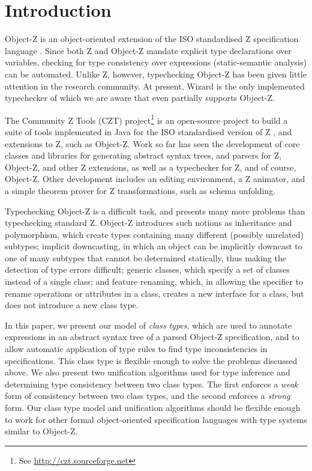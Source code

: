 \section{Introduction}

Object-Z \cite{smith00} is an object-oriented extension of the ISO
standardised Z specification language \cite{isoz}. Since both Z
and Object-Z mandate explicit type declarations over variables,
checking for type consistency over expressions (static-semantic
analysis) can be automated. Unlike Z, however, typechecking Object-Z
has been given little attention in the research community.  At
present, Wizard \cite{johnston96} is the only implemented typechecker
of which we are aware that even partially supports Object-Z.

The Community Z Tools (CZT) project\footnote{See
\url{http://czt.sourceforge.net}} is an open-source project to build a
suite of tools implemented in Java for the ISO standardised version of
Z \cite{isoz}, and extensions to Z, such as Object-Z. Work so far has
seen the development of core classes and libraries for generating
abstract syntax trees, and parsers for Z, Object-Z, and other Z
extensions, as well as a typechecker for Z, and of course,
Object-Z. Other development includes an editing environment, a Z
animator, and a simple theorem prover for  Z transformations, such as
schema unfolding.

Typechecking Object-Z is a difficult task, and presents many more
problems than typechecking standard Z. Object-Z introduces such
notions as inheritance and polymorphism, which create types containing
many different (possibly unrelated) subtypes; implicit downcasting, in
which an object can be implicitly downcast to one of many subtypes
that cannot be determined statically, thus making the detection of
type errors difficult; generic classes, which specify a set of classes
instead of a single class; and feature renaming, which, in allowing
the specifier to rename operations or attributes in a class, creates a
new interface for a class, but does not introduce a new class type.

In this paper, we present our model of {\em class types}, which are
used to annotate expressions in an abstract syntax tree of a parsed
Object-Z specification, and to allow automatic application of type
rules to find type inconsistencies in specifications. This class type
is flexible enough to solve the problems discussed above. We also
present two unification algorithms used for type inference and
determining type consistency between two class types. The first
enforces a {\em weak} form of consistency between two class types, and
the second enforces a {\em strong} form. Our class type model and
unification algorithms should be flexible enough to work for other
formal object-oriented specification languages with type systems
similar to Object-Z.
